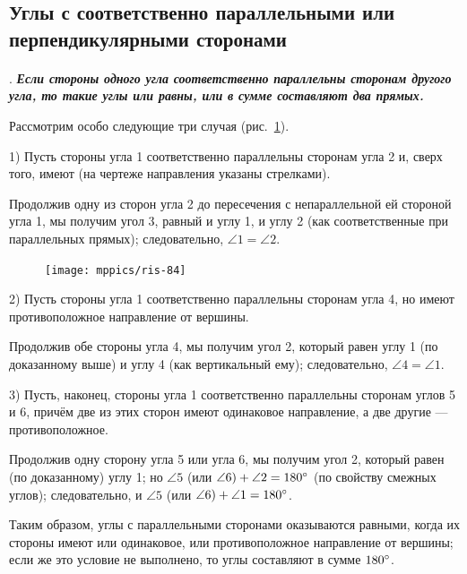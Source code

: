 \documentclass[oneside]{book}
\begin{document}
\subsection*{Углы с соответственно параллельными или перпендикулярными сторонами}

\paragraph{}\label{1938/79}
.
\textbf{\emph{Если стороны одного угла соответственно параллельны сторонам другого угла, то такие углы или равны, или в сумме составляют два прямых.}}

Рассмотрим особо следующие три случая (рис.~\ref{1938/ris-84}).

1) Пусть стороны угла 1 соответственно параллельны сторонам угла 2 и, сверх того, имеют  (на чертеже направления указаны стрелками).

Продолжив одну из сторон угла 2 до пересечения с непараллельной ей стороной угла 1, мы получим угол 3, равный и углу 1, и углу 2 (как соответственные при параллельных прямых);
следовательно, $\angle 1 = \angle 2$.

\begin{figure}
\centering
\texttt{[image: mppics/ris-84]}
\caption{}\label{1938/ris-84}
\end{figure}

2) Пусть стороны угла 1 соответственно параллельны сторонам угла 4, но имеют противоположное направление от вершины.

Продолжив обе стороны угла 4, мы получим угол 2, который равен углу 1 (по доказанному выше) и углу 4 (как вертикальный ему);
следовательно, $\angle 4 = \angle 1$.

3) Пусть, наконец, стороны угла 1 соответственно параллельны сторонам углов 5 и 6, причём две из этих сторон имеют одинаковое направление, а две другие — противоположное.

Продолжив одну сторону угла 5 или угла 6, мы получим угол 2, который равен (по доказанному) углу 1;
но $\angle 5$ (или $\angle 6) +\angle 2 \z= 180\degree$ (по свойству смежных углов);
следовательно, и $\angle 5$ (или $\angle 6) \z+ \angle 1 \z= 180\degree$.

Таким образом, углы с параллельными сторонами оказываются равными, когда их стороны имеют или одинаковое, или противоположное направление от вершины;
если же это условие не выполнено, то углы составляют в сумме $180\degree$.
\end{document}
